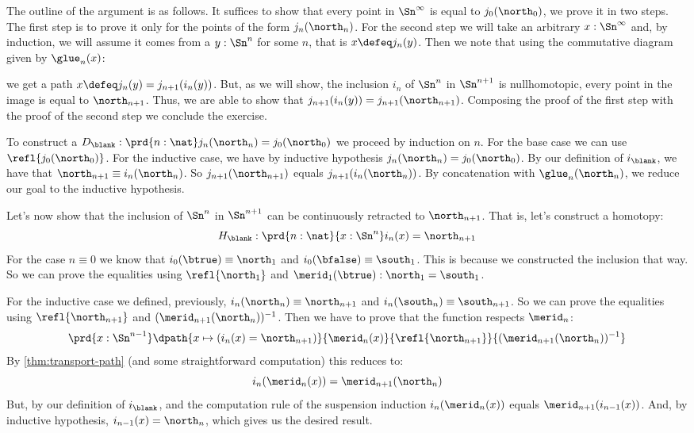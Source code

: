 \documentclass[
%
%
11pt %
]{article}
\begin{document}
The outline of the argument is as follows. It suffices to show that every point in
$\Sn^{\infty}$ is equal to $j_0(\north_0)$, we prove it in two steps.
The first step is to prove it only for the points of the form $j_n(\north_n)$.
For the second step we will take an arbitrary $x:\Sn^{\infty}$
and, by induction, we will assume it comes from a $y : \Sn^n$ for some $n$,
that is $x \defeq j_n(y)$.
Then we note that using the commutative diagram given by $\glue_n(x)$:
\begin{center}
\end{center}
we get a path $x \defeq j_n(y) = j_{n+1} (i_n(y))$.
But, as we will show, the inclusion $i_n$ of $\Sn^n$ in $\Sn^{n+1}$ is nullhomotopic,
every point in the image is equal to $\north_{n+1}$. Thus, we are able to show that
$j_{n+1}(i_n(y)) = j_{n+1}(\north_{n+1})$. Composing the proof of the first step
with the proof of the second step we conclude the exercise.

To construct a $D_{\blank} : \prd{n:\nat} j_n(\north_n) = j_0(\north_0)$ we
proceed by induction on $n$. For the base case we can
use $\refl{j_0(\north_0)}$. For the inductive case, we have by inductive
hypothesis $j_n(\north_n) = j_0(\north_0)$. By our definition of $i_{\blank}$,
we have that $\north_{n+1} \equiv i_n(\north_n)$. So $j_{n+1} (\north_{n+1})$
equals $j_{n+1}(i_n(\north_n))$. By concatenation with $\glue_n(\north_n)$,
we reduce our goal to the inductive hypothesis.

Let's now show that the inclusion of $\Sn^n$ in $\Sn^{n+1}$ can be
continuously retracted to $\north_{n+1}$.
That is, let's construct a homotopy:
\[ H_{\blank} : \prd{n:\nat}{x:\Sn^n} i_n(x) = \north_{n+1} \]
For the case $n\equiv 0$ we know that $i_0(\btrue) \equiv \north_1$ and
$i_0(\bfalse) \equiv \south_1$.  This is because we constructed the inclusion
that way. So we can prove the equalities
using $\refl{\north_1}$ and $\merid_1(\btrue) : \north_1 = \south_1$.

For the inductive case we defined, previously, $i_n(\north_n) \equiv \north_{n+1}$
and $i_n(\south_{n}) \equiv \south_{n+1}$. So we can prove the equalities using
$\refl{\north_{n+1}}$ and $(\merid_{n+1}(\north_n))^{-1}$.
Then we have to prove that the function respects $\merid_n$:
\[ \prd{x:\Sn^{n-1}} \dpath {x\mapsto (i_n(x) = \north_{n+1})} {\merid_n(x)} {\refl{\north_{n+1}}} {(\merid_{n+1}(\north_n))^{-1}} \]
By \cref{thm:transport-path} (and some straightforward computation) this reduces to:
\[ i_n(\merid_n(x)) = \merid_{n+1}(\north_{n}) \]
But, by our definition of $i_{\blank}$, and the computation rule of the
suspension induction $i_n(\merid_n(x))$ equals $\merid_{n+1} (i_{n-1}(x))$.
And, by inductive hypothesis, $i_{n-1}(x) = \north_n$, which gives us the
desired result.
\end{document}
